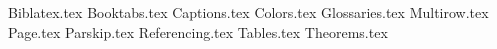 {Biblatex.tex}
{Booktabs.tex}
{Captions.tex}
{Colors.tex}
{Glossaries.tex}
{Multirow.tex}
{Page.tex}
{Parskip.tex}
{Referencing.tex}
{Tables.tex}
{Theorems.tex}
\usepackage[english]{babel}
\usepackage{amsmath}
\usepackage{amssymb}
\usepackage{csquotes}
\usepackage{expl3}
\usepackage{fontspec}
\usepackage{graphicx}
\usepackage{keyval}
\usepackage{url}
\usepackage{xparse}
\usepackage{blindtext}
\usepackage{datetime2}
\usepackage{float}
\usepackage{algorithm}
\usepackage{algpseudocode}
\usepackage{kbordermatrix}
